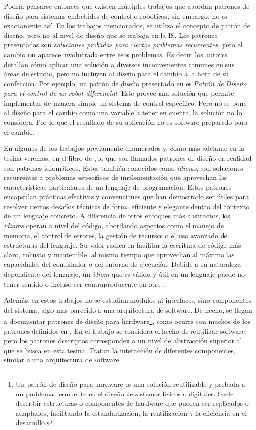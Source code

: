 Podría pensarse entonces que existen múltiples trabajos que abordan patrones de diseño para sistemas embebidos de control o robóticos, sin embargo, no es exactamente así. En los trabajos mencionados, se utiliza el concepto de patrón de diseño, pero no al nivel de diseño que se trabaja en la IS. Los patrones presentados son \textit{soluciones probadas para ciertos problemas recurrentes}, pero el cambio \textbf{no} aparece involucrado entre esos problemas. Es decir, los autores detallan cómo aplicar una solución a diversos inconvenientes comunes en sus áreas de estudio, pero no incluyen al diseño para el cambio a la hora de su confección. Por ejemplo, un patrón de diseño presentado en \cite{robotArg} es \textit{Patrón de Diseño para el control de un robot diferencial}. Este provee una solución que permite implementar de manera simple un sistema de control específico. Pero no se pone al diseño para el cambio como una variable a tener en cuenta, la solución no lo considera. Por lo que el resultado de su aplicación no es software preparado para el cambio.

En algunos de los trabajos previamente enumerados y, como más adelante en la tesina veremos, en el libro de \cite{douglass}, lo que son llamados patrones de diseño en realidad son patrones idiomáticos. Estos también conocidos como \textit{idioms}, son soluciones recurrentes a problemas específicos de implementación que aprovechan las características particulares de un lenguaje de programación. Estos patrones encapsulan prácticas efectivas y convenciones que han demostrado ser útiles para resolver ciertos desafíos técnicos de forma eficiente y elegante dentro del contexto de un lenguaje concreto. A diferencia de otros enfoques más abstractos, los \textit{idioms} operan a nivel del código, abordando aspectos como el manejo de memoria, el control de errores, la gestión de recursos o el uso avanzado de estructuras del lenguaje. Su valor radica en facilitar la escritura de código más claro, robusto y mantenible, al mismo tiempo que aprovechan al máximo las capacidades del compilador o del entorno de ejecución. Debido a su naturaleza dependiente del lenguaje, un \textit{idiom} que es válido y útil en un lenguaje puede no tener sentido o incluso ser contraproducente en otro \cite{buschmann1996posa1}.

Además, en estos trabajos no se estudian módulos ni interfaces, sino componentes del sistema, algo más parecido a una arquitectura de software. De hecho, se llegan a documentar patrones de diseño para hardware\footnote{Un patrón de diseño para hardware es una solución reutilizable y probada a un problema recurrente en el diseño de sistemas físicos o digitales. Suele describir estructuras o componentes de hardware que pueden ser replicados o adaptados, facilitando la estandarización, la reutilización y la eficiencia en el desarrollo.}, como ocurre con muchos de los patrones definidos en \cite{critical}. En el trabajo \cite{stable} se considera el hecho de reutilizar software, pero los patrones descriptos corresponden a un nivel de abstracción superior al que se busca en esta tesina. Tratan la interacción de diferentes componentes, similar a una arquitectura de software.

